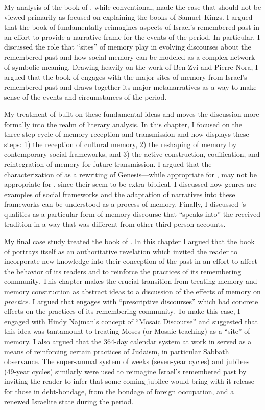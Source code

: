 My analysis of the book of \chronicles, while conventional, made the case that \chronicles should not be viewed primarily as focused on explaining the books of Samuel--Kings. I argued that the book of \chronicles fundamentally reimagines aspects of Israel's remembered past in an effort to provide a narrative frame for the events of the \secondtemple period. In particular, I discussed the role that ``sites'' of memory play in evolving discourses about the remembered past and how social memory can be modeled as a complex network of symbolic meaning.  Drawing heavily on the work of Ben Zvi and Pierre Nora, I argued that the book of \chronicles engages with the major sites of memory from Israel's remembered past and draws together its major metanarratives as a way to make sense of the events and circumstances of the \secondtemple period.

My treatment of \ga built on these fundamental ideas and moves the discussion more formally into the realm of literary analysis. In this chapter, I focused on the three-step cycle of memory reception and transmission and how \ga displays these steps: 1) the reception of cultural memory, 2) the reshaping of memory by contemporary social frameworks, and 3) the active construction, codification, and reintegration of memory for future transmission. I argued that the characterization of \ga as a rewriting of Genesis---while appropriate for , may not be appropriate for , since their \vorlagen seem to be extra-biblical. I discussed how genres are examples of social frameworks and the adaptation of \ga narratives into these frameworks can be understood as a process of memory. Finally, I discussed \ga's \psgraphical qualities as a particular form of memory discourse that ``speaks into'' the received tradition in a way that was different from other third-person accounts.

My final case study treated the book of \jub. In this chapter I argued that the book of \jub portrays itself as an authoritative revelation which invited the reader to incorporate new knowledge into their conception of the past in an effort to affect the behavior of its readers and to reinforce the practices of its remembering community. This chapter makes the crucial transition from treating memory and memory construction as abstract ideas to a discussion of the effects of memory on \emph{practice}. I argued that \jub engages with ``prescriptive discourses'' which had concrete effects on the practices of its remembering community. To make this case, I engaged with Hindy Najman's concept of ``Mosaic Discourse'' and suggested that this idea was tantamount to treating Moses (or Mosaic teaching) as a ``site'' of memory. I also argued that the 364-day calendar system at work in \jub served as a means of reinforcing certain practices of \secondtemple Judaism, in particular Sabbath observance. The super-annual system of weeks (seven-year cycles) and jubilees (49-year cycles) similarly were used to reimagine Israel's remembered past by inviting the reader to infer that some coming jubilee would bring with it release for those in debt-bondage, from the bondage of foreign occupation, and a renewed Israelite state during the \secondtemple period.


